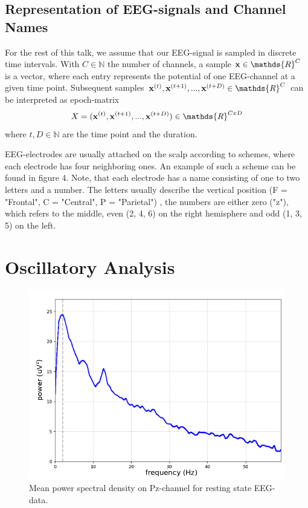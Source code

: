 \documentclass[12pt,twoside,twocolumn]{article}
\begin{document}
\subsection{Representation of EEG-signals and Channel Names}
For the rest of this talk, we assume that our EEG-signal is sampled in discrete time intervals. With $C \in \mathds{N}$ the number of channels, a sample ${\bf x} \in \mathds{R}^C$ is a vector, where each entry represents the potential of one EEG-channel at a given time point. Subsequent samples ${\bf x}^{(t)}, {\bf x}^{(t+1)}, ..., {\bf x}^{(t+D)} \in \mathds{R}^C$ can be interpreted as epoch-matrix 
\begin{equation}
X = ({\bf x}^{(t)}, {\bf x}^{(t+1)}, ..., {\bf x}^{(t+D)}) \in \mathds{R}^{CxD}
\end{equation}
where $t, D \in \mathds{N}$ are the time point and the duration. 

EEG-electrodes are usually attached on the scalp according to schemes, where each electrode has four neighboring ones. An example of such a scheme can be found in figure 4. Note, that each electrode has a name consisting of one to two letters and a number. The letters usually describe the vertical position (F = "Frontal", C = "Central", P = "Parietal") , the numbers are either zero ("z"), which refers to the middle, even (2, 4, 6) on the right hemisphere and odd (1, 3, 5) on the left.


\section{Oscillatory Analysis}

\begin{figure}
\includegraphics[scale=0.28]{psd.png}
\caption{Mean power spectral density on Pz-channel for resting state EEG-data.}
\end{figure}
\end{document}
